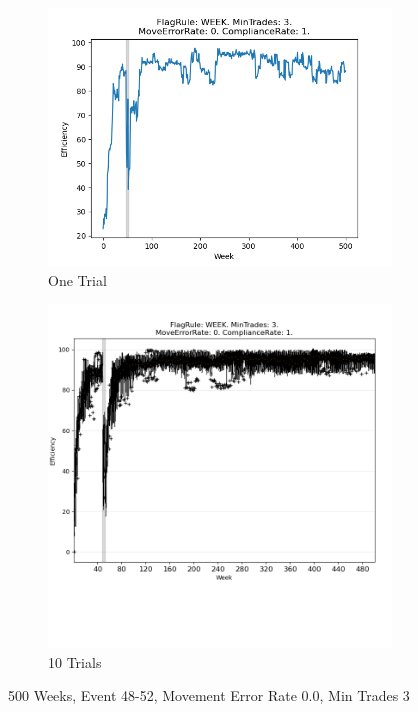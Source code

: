 \documentclass{article}%
\begin{document}
\begin{figure}[!htb]%
\begin{subfigure}[b]{0.45\linewidth}%
\includegraphics[width=\linewidth]{1030fr_WEEK_mt_3_er_0_cr_1_t1.png}%
\caption{One Trial}%
\end{subfigure}%
\begin{subfigure}[b]{0.45\linewidth}%
\includegraphics[clip,width=\linewidth,trim=0 4cm 0 0]{1030fr_WEEK_mt_3_er_0_cr_1_t10.png}%
\caption{10 Trials}%
\end{subfigure}%
\caption{500 Weeks, Event 48{-}52, Movement Error Rate 0.0, Min Trades 3}%
\end{figure}
\end{document}
